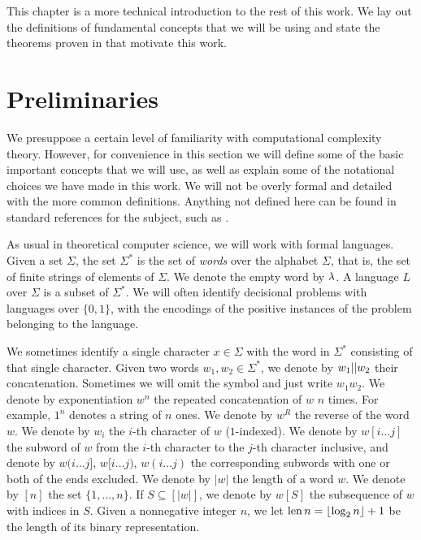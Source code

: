 This chapter is a more technical introduction to the rest of this work. 
We lay out the definitions of fundamental concepts that we will be using
and state the theorems proven in \cite{ConstructiveSeparations} that 
motivate this work. 

\section{Preliminaries}

We presuppose a certain level of familiarity with computational complexity theory. However, 
for convenience in this section we will define some of the basic important concepts 
that we will use, as well as explain some of the notational choices we have made
in this work. We will not be overly formal and detailed with the more common definitions.
Anything not defined here can be found in standard references for the subject, 
such as \cite{AB09}.

As usual in theoretical computer science, we will work with formal languages.
Given a set $\Sigma$, the set $\Sigma^*$ is the set of \emph{words} over 
the alphabet $\Sigma$, that is, the set of finite strings of elements of $\Sigma$.
We denote the empty word by $\lambda$. 
A language $L$ over $\Sigma$ is a subset of $\Sigma^*$. We will often identify
decisional problems with languages over $\{0, 1\}$, with the encodings of the positive instances of the 
problem belonging to the language. 

We sometimes identify a single character $x \in \Sigma$ with the word in $\Sigma^*$ consisting of that
single character. Given two words $w_1, w_2 \in \Sigma^*$, we denote by $w_1 || w_2$ their 
concatenation. Sometimes we will omit the symbol and just write $w_1w_2$. We denote by exponentiation
$w^n$ the repeated concatenation of $w$ $n$ times. For example, $1^n$ denotes a string of $n$ ones.
We denote by $w^R$ the reverse of the word $w$. We denote by $w_i$ the $i$-th character of $w$ 
($1$-indexed).
We denote by $w[i \ldots j]$ the subword of 
$w$ from the $i$-th character to the $j$-th character inclusive, and denote by 
$w(i \ldots j]$, $w[i \ldots j)$, $w(i \ldots j)$ the corresponding subwords with one or both of the
ends excluded.  
We denote by $|w|$ the length of a word $w$. We denote by $[n]$ the set $\{1, \ldots, n\}$.
If $S \subseteq [|w|]$, we denote by $w[S]$ the subsequence of $w$ with indices in $S$.
Given a nonnegative integer $n$, we let 
$\operatorname{len} n = \lfloor \log_2 n \rfloor + 1$ be the length of its binary representation.  


